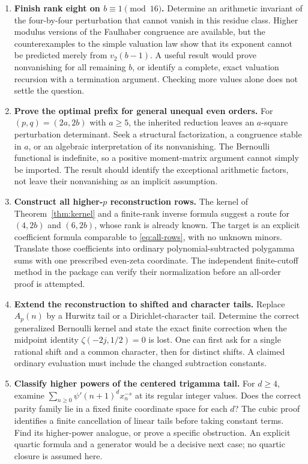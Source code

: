 \documentclass[11pt,letterpaper]{article}
\theoremstyle{definition}
\theoremstyle{remark}
\numberwithin{equation}{section}
\begin{document}
\begin{enumerate}[leftmargin=*,label=\textbf{Q\arabic*.}]

\item \textbf{Finish rank eight on $b\equiv1\pmod {16}$.}
Determine an arithmetic invariant of the four-by-four perturbation that
cannot vanish in this residue class. Higher modulus versions of the
Faulhaber congruence are available, but the counterexamples to the simple
valuation law show that its exponent cannot be predicted merely from
$v_2(b-1)$. A useful result would prove nonvanishing for all remaining
$b$, or identify a complete, exact valuation recursion with a termination
argument. Checking more values alone does not settle the question.

\item \textbf{Prove the optimal prefix for general unequal even orders.}
For $(p,q)=(2a,2b)$ with $a\ge5$, the inherited reduction leaves an
$a$-square perturbation determinant. Seek a structural factorization,
a congruence stable in $a$, or an algebraic interpretation of its
nonvanishing. The Bernoulli functional is indefinite, so a positive
moment-matrix argument cannot simply be imported. The result should
identify the exceptional arithmetic factors, not leave their nonvanishing
as an implicit assumption.

\item \textbf{Construct all higher-$p$ reconstruction rows.}
The kernel of Theorem~\ref{thm:kernel} and a finite-rank inverse formula
suggest a route for $(4,2b)$ and $(6,2b)$, whose rank is already known.
The target is an explicit coefficient formula comparable to
\eqref{eq:all-rows}, with no unknown minors. Translate those coefficients
into ordinary polynomial-subtracted polygamma sums with one prescribed
even-zeta coordinate. The independent finite-cutoff method in the package
can verify their normalization before an all-order proof is attempted.

\item \textbf{Extend the reconstruction to shifted and character tails.}
Replace $A_p(n)$ by a Hurwitz tail or a Dirichlet-character tail.
Determine the correct generalized Bernoulli kernel and state the exact
finite correction when the midpoint identity
$\zeta(-2j,1/2)=0$ is lost. One can first ask for a single rational
shift and a common character, then for distinct shifts. A claimed
ordinary evaluation must include the changed subtraction constants.

\item \textbf{Classify higher powers of the centered trigamma tail.}
For $d\ge4$, examine
$\sum_{n\ge0}\psi'(n+1)^d x_n^{-s}$ at its regular integer values.
Does the correct parity family lie in a fixed finite coordinate space
for each $d$? The cubic proof identifies a finite cancellation of linear
tails before taking constant terms. Find its higher-power analogue, or
prove a specific obstruction. An explicit quartic formula and a generator
would be a decisive next case; no quartic closure is assumed here.


\end{enumerate}
\end{document}
